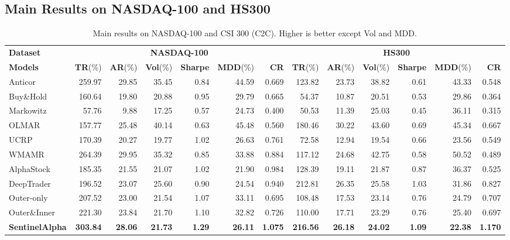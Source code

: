 \documentclass[letterpaper]{article} %
\begin{document}
\subsection{Main Results on NASDAQ-100 and HS300}
\begin{table}[t]
\centering
\caption{Main results on NASDAQ-100 and CSI 300 (C2C). Higher is better except Vol and MDD.}
\label{tab:main_results_style}
\small
\setlength{\tabcolsep}{3pt}
\renewcommand{\arraystretch}{1.05}
\begin{tabular}{l|rrrrrr|rrrrrr}
\toprule
\textbf{Dataset} & \multicolumn{6}{c|}{\textbf{NASDAQ-100}} & \multicolumn{6}{c}{\textbf{HS300}} \\
\cmidrule(lr){2-7}\cmidrule(lr){8-13}
\textbf{Models} 
& \textbf{TR}{\scriptsize(\%)} & \textbf{AR}{\scriptsize(\%)} & \textbf{Vol}{\scriptsize(\%)} & \textbf{Sharpe} & \textbf{MDD}{\scriptsize(\%)} & \textbf{CR}
& \textbf{TR}{\scriptsize(\%)} & \textbf{AR}{\scriptsize(\%)} & \textbf{Vol}{\scriptsize(\%)} & \textbf{Sharpe} & \textbf{MDD}{\scriptsize(\%)} & \textbf{CR} \\
\midrule
Anticor        & 259.97 & 29.85 & 35.45 & 0.84 & 44.59 & 0.669 & 123.82 & 23.73 & 38.82 & 0.61 & 43.33 & 0.548 \\
Buy\&Hold      & 160.64 & 19.80 & 20.88 & 0.95 & 29.79 & 0.665 &  54.37 & 10.87 & 20.51 & 0.53 & 29.86 & 0.364 \\
Markowitz      &  57.76 &  9.88 & 17.25 & 0.57 & 24.73 & 0.400 &  50.53 & 11.39 & 25.03 & 0.45 & 36.11 & 0.315 \\
OLMAR          & 157.77 & 25.48 & 40.14 & 0.63 & 45.48 & 0.560 & 180.46 & 30.22 & 43.60 & 0.69 & 45.34 & 0.667 \\
UCRP           & 170.39 & 20.27 & 19.77 & 1.02 & 26.63 & 0.761 &  72.58 & 12.94 & 19.54 & 0.66 & 23.56 & 0.549 \\
WMAMR          & 264.39 & 29.95 & 35.32 & 0.85 & 33.88 & 0.884 & 117.12 & 24.68 & 42.75 & 0.58 & 50.52 & 0.489 \\
AlphaStock     & 185.35 & 21.55 & 21.07 & 1.02 & 21.90 & 0.984 & 128.39 & 19.11 & 21.87 & 0.87 & 36.37 & 0.525 \\
DeepTrader     & 196.52 & 23.07 & 25.60 & 0.90 & 24.54 & 0.940 & 212.81 & 26.35 & 25.58 & 1.03 & 31.86 & 0.827 \\
Outer-only     & 207.52 & 23.00 & 21.54 & 1.07 & 33.11 & 0.695 & 108.48 & 17.53 & 23.14 & 0.76 & 24.79 & 0.707 \\
Outer\&Inner   & 221.30 & 23.84 & 21.70 & 1.10 & 32.82 & 0.726 & 110.00 & 17.71 & 23.29 & 0.76 & 25.40 & 0.697 \\
\midrule
\textbf{SentinelAlpha}
& \textbf{303.84} & \textbf{28.06} & \textbf{21.73} & \textbf{1.29} & \textbf{26.11} & \textbf{1.075}
& \textbf{216.56} & \textbf{26.18} & \textbf{24.02} & \textbf{1.09} & \textbf{22.38} & \textbf{1.170} \\
\bottomrule
\end{tabular}
\end{table}
\end{document}
